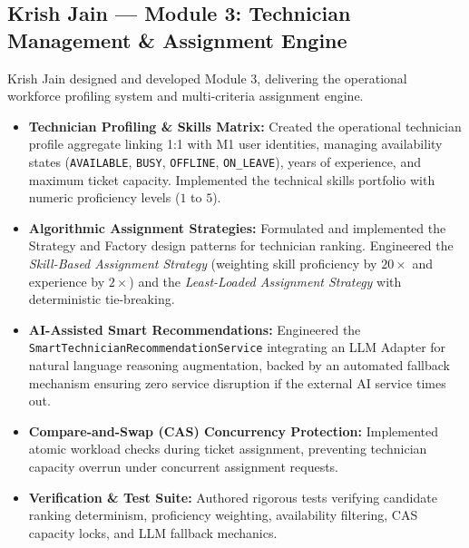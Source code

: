 \documentclass[11pt,a4paper,oneside]{report}
\begin{document}
\subsection{Krish Jain --- Module 3: Technician Management \& Assignment Engine}
\label{subsec:contrib_krish}
Krish Jain designed and developed Module 3, delivering the operational workforce profiling system and multi-criteria assignment engine.
\begin{itemize}
    \item \textbf{Technician Profiling \& Skills Matrix:} Created the operational technician profile aggregate linking 1:1 with M1 user identities, managing availability states (\texttt{AVAILABLE}, \texttt{BUSY}, \texttt{OFFLINE}, \texttt{ON\_LEAVE}), years of experience, and maximum ticket capacity. Implemented the technical skills portfolio with numeric proficiency levels ($1$ to $5$).
    \item \textbf{Algorithmic Assignment Strategies:} Formulated and implemented the Strategy and Factory design patterns for technician ranking. Engineered the \textit{Skill-Based Assignment Strategy} (weighting skill proficiency by $20\times$ and experience by $2\times$) and the \textit{Least-Loaded Assignment Strategy} with deterministic tie-breaking.
    \item \textbf{AI-Assisted Smart Recommendations:} Engineered the \texttt{SmartTechnicianRecommendationService} integrating an LLM Adapter for natural language reasoning augmentation, backed by an automated fallback mechanism ensuring zero service disruption if the external AI service times out.
    \item \textbf{Compare-and-Swap (CAS) Concurrency Protection:} Implemented atomic workload checks during ticket assignment, preventing technician capacity overrun under concurrent assignment requests.
    \item \textbf{Verification \& Test Suite:} Authored rigorous tests verifying candidate ranking determinism, proficiency weighting, availability filtering, CAS capacity locks, and LLM fallback mechanics.
\end{itemize}
\end{document}
